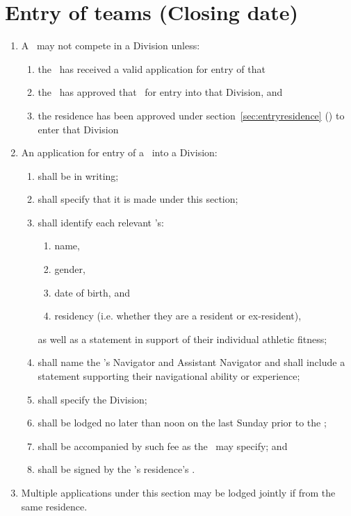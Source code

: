 \documentclass[12pt]{report}
\begin{document}
  \section{Entry of teams (Closing date)}\label{sec:EntryCompetitorDivision}
  \begin{enumerate}
    \item A \team\ may not compete in a Division unless:
     \begin{enumerate}
     \item  the \RaceDirector\ has received a valid application for entry of that \team\,
     \item  the \RaceDirector\ has approved that \team\ for entry into that Division, and
     \item the residence has been approved under section~\ref{sec:entryresidence} () to enter that Division
         \end{enumerate}
    \item An application for entry of a \team\ into a Division:
    \begin{enumerate}
      \item shall be in writing;
      \item shall specify that it is made under this section;
      \item shall identify each relevant \competitor's:
      \begin{enumerate}
        \item name,
        \item gender,
        \item date of birth, and
        \item residency (i.e. whether they are a resident or ex-resident),
      \end{enumerate}
      as well as a statement in support of their individual athletic fitness;
      \item shall name the \team's Navigator and Assistant Navigator and shall include a statement supporting their navigational ability or experience;
      \item shall specify the Division;
       \item shall be lodged no later than noon on the last Sunday prior to the \Event;
      \item shall be accompanied by such fee as the \RaceDirector\ may specify; and
      \item shall be signed by the \team's residence's \Coach.
    \end{enumerate}
    \item Multiple applications under this section may be lodged jointly if from the same residence.
  \end{enumerate}
\end{document}
